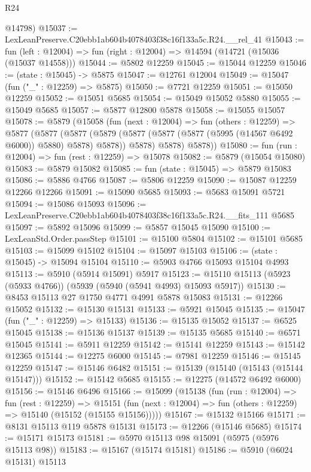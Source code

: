 \begin{lexlean}{R24}
\begin{coremodule}
      @14798)
@15037 := LexLeanPreserve.C20ebb1ab604b4078403f38c16f133a5c.R24.__rel_41
@15043 := fun (left : @12004) => fun (right : @12004) => @14594 (@14721 (@15036 (@15037 @14558)))
@15044 := @5802 @12259
@15045 := @15044 @12259
@15046 := (state : @15045) -> @5875
@15047 := @12761 @12004
@15049 := @15047 (fun ("_" : @12259) => @5875)
@15050 := @7721 @12259
@15051 := @15050 @12259
@15052 := @15051 @5685
@15054 := @15049 @15052 @5880
@15055 := @15049 @5685
@15057 := @5877 @12800 @5878
@15058 := @15055 @15057
@15078 := @5879
    (@15058
      (fun (next : @12004) =>
      fun (others : @12259) =>
      @5877
        (@5877
          (@5877
            (@5879 (@5877 (@5877 (@5877 (@5995 (@14567 @6492 @6000)) @5880) @5878) @5878))
            @5878)
          @5878)
        @5878))
@15080 := fun (run : @12004) => fun (rest : @12259) => @15078
@15082 := @5879 (@15054 @15080)
@15083 := @5879 @15082
@15085 := fun (state : @15045) => @5879 @15083
@15086 := @5886 @4766
@15087 := @5806 @12259
@15090 := @15087 @12259 @12266 @12266
@15091 := @15090 @5685
@15093 := @5683 @15091 @5721
@15094 := @15086 @15093
@15096 := LexLeanPreserve.C20ebb1ab604b4078403f38c16f133a5c.R24.__fits_111 @5685
@15097 := @5892 @15096
@15099 := @5857 @15045 @15090
@15100 := LexLeanStd.Order.passStep
@15101 := @15100 @5804
@15102 := @15101 @5685
@15103 := @15099 @15102
@15104 := @15097 @15103
@15106 := (state : @15045) -> @15094 @15104
@15110 := @5903 @4766 @15093 @15104 @4993
@15113 := @5910 (@5914 @15091) @5917
@15123 := @15110 @15113 (@5923 (@5933 @4766)) (@5939 (@5940 (@5941 @4993) @15093 @5917))
@15130 := @8453 @15113 @27 @1750 @4771 @4991 @5878 @15083
@15131 := @12266 @15052
@15132 := @15130 @15131
@15133 := @5921 @15045
@15135 := @15047 (fun ("_" : @12259) => @15133)
@15136 := @15135 @15052
@15137 := @6525 @15045
@15138 := @15136 @15137
@15139 := @15135 @5685
@15140 := @6571 @15045
@15141 := @5911 @12259
@15142 := @15141 @12259
@15143 := @15142 @12365
@15144 := @12275 @6000
@15145 := @7981 @12259
@15146 := @15145 @12259
@15147 := @15146 @6482
@15151 := @15139 (@15140 (@15143 (@15144 @15147)))
@15152 := @15142 @5685
@15155 := @12275 (@14572 @6492 @6000)
@15156 := @15146 @6496
@15166 := @15099
    (@15138
      (fun (run : @12004) =>
      fun (rest : @12259) =>
      @15151 (fun (next : @12004) => fun (others : @12259) => @15140 (@15152 (@15155 @15156)))))
@15167 := @15132 @15166
@15171 := @8131 @15113 @119 @5878 @15131
@15173 := @12266 (@15146 @5685)
@15174 := @15171 @15173
@15181 := @5970 @15113 @98 @15091 (@5975 (@5976 @15113 @98))
@15183 := @15167 (@15174 @15181)
@15186 := @5910 (@6024 @15131) @15113

\end{coremodule}
\end{lexlean}
